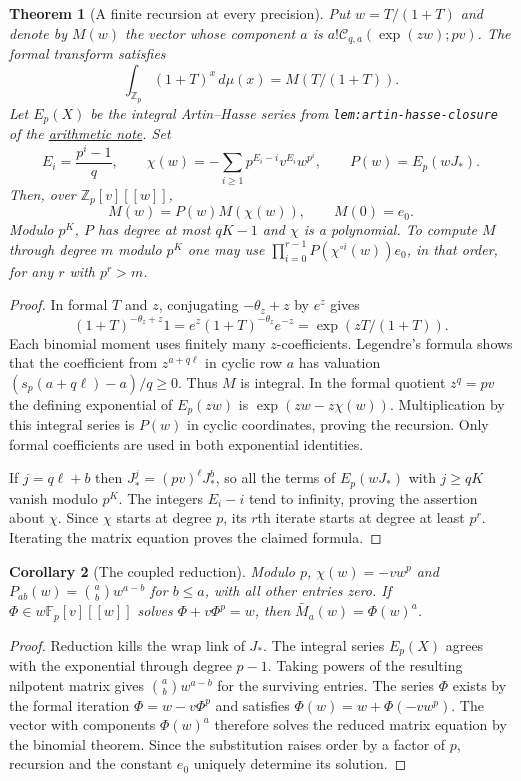 \documentclass[11pt]{article}
\newtheorem{theorem}{Theorem}\newtheorem{corollary}[theorem]{Corollary}
\begin{document}
\begin{theorem}[A finite recursion at every precision]\label{thm:matrix}
Put $w=T/(1+T)$ and denote by $M(w)$ the vector whose component
$a$ is $a!\mathcal C_{q,a}(\exp(zw);pv)$. The formal transform satisfies
\[
             \int_{\mathbb Z_p}(1+T)^x\,d\mu(x)=M(T/(1+T)).
\]
Let $E_p(X)$ be the integral Artin--Hasse series from
\texttt{lem:artin-hasse-closure} of the
\href{ARITHMETIC_FRONTIER_TERMINAL_ORDERS.tex}{arithmetic note}.
Set
\[
 E_i=\frac{p^i-1}{q},\qquad
 \chi(w)=-\sum_{i\ge1}p^{E_i-i}v^{E_i}w^{p^i},\qquad
 P(w)=E_p(wJ_*).
\]
Then, over $\mathbb Z_p[v][[w]]$,
\[
                M(w)=P(w)M(\chi(w)),\qquad M(0)=e_0 .
\]
Modulo $p^K$, $P$ has degree at most $qK-1$ and $\chi$ is a
polynomial. To compute $M$ through degree $m$ modulo $p^K$ one
may use $\prod_{i=0}^{r-1}P(\chi^{\circ i}(w))e_0$, in that order,
for any $r$ with $p^r>m$.
\end{theorem}
\begin{proof}
In formal $T$ and $z$, conjugating $-\theta_z+z$ by $e^z$
gives
\[
 (1+T)^{-\theta_z+z}1=e^z(1+T)^{-\theta_z}e^{-z}
                    =\exp(zT/(1+T)).
\]
Each binomial moment uses finitely many $z$-coefficients.
Legendre's formula shows that the coefficient from
$z^{a+q\ell}$ in cyclic row $a$ has valuation
$(s_p(a+q\ell)-a)/q\ge0$. Thus $M$ is integral.
In the formal quotient $z^q=pv$ the defining exponential of
$E_p(zw)$ is $\exp(zw-z\chi(w))$.
Multiplication by this integral series is $P(w)$ in cyclic
coordinates, proving the recursion. Only formal coefficients
are used in both exponential identities.

If $j=q\ell+b$ then $J_*^j=(pv)^\ell J_*^b$, so all the terms
of $E_p(wJ_*)$ with $j\ge qK$ vanish modulo $p^K$. The integers
$E_i-i$ tend to infinity, proving the assertion about $\chi$.
Since $\chi$ starts at degree $p$, its $r$th iterate starts at
degree at least $p^r$. Iterating the matrix equation proves the
claimed formula.
\end{proof}

\begin{corollary}[The coupled reduction]\label{cor:reduced}
Modulo $p$, $\chi(w)=-vw^p$ and $P_{ab}(w)=\binom ab w^{a-b}$
for $b\le a$, with all other entries zero.
If $\Phi\in w\mathbb F_p[v][[w]]$ solves $\Phi+v\Phi^p=w$,
then $\bar M_a(w)=\Phi(w)^a$.
\end{corollary}
\begin{proof}
Reduction kills the wrap link of $J_*$. The integral series
$E_p(X)$ agrees with the exponential through degree $p-1$.
Taking powers of the resulting nilpotent matrix gives
$\binom ab w^{a-b}$ for the surviving entries.
The series $\Phi$ exists by the formal iteration
$\Phi=w-v\Phi^p$ and satisfies $\Phi(w)=w+\Phi(-vw^p)$.
The vector with components $\Phi(w)^a$ therefore solves
the reduced matrix equation by the binomial theorem. Since the
substitution raises order by a factor of $p$, recursion and the
constant $e_0$ uniquely determine its solution.
\end{proof}
\end{document}
